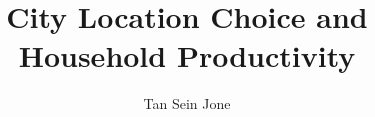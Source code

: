 \documentclass[10pt]{article}
\title{City Location Choice and Household Productivity}
\author{Tan Sein Jone}
\date{}
\begin{document}
\doublespacing
\maketitle









\end{document}
